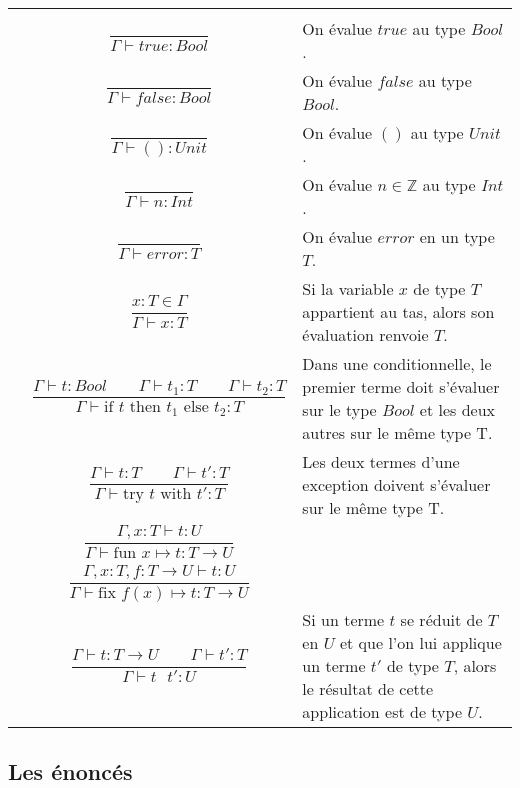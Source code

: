 \documentclass[11pt, a4paper, notitlepage]{article}
\begin{document}
\begin{center}
   \renewcommand{\arraystretch}{2}
   \begin{tabular}{|lcp{}|}
      \hline
      & &\\[-5mm]
      & $\dfrac{}{\Gamma \vdash true : Bool}$ & On évalue $true$ au type $Bool$.\\
      & $\dfrac{}{\Gamma \vdash false : Bool}$ & On évalue $false$ au type $Bool$.\\
      & $\dfrac{}{\Gamma \vdash () : Unit}$ & On évalue $()$ au type $Unit$.\\
      & $\dfrac{}{\Gamma \vdash n : Int}$ & On évalue $n \in \mathbb{Z}$ au type $Int$.\\
      & $\dfrac{}{\Gamma \vdash error : T}$ & On évalue $error$ en un type $T$.\\
      & $\dfrac{x : T \in \Gamma}{\Gamma \vdash x : T}$ & Si la variable $x$ de type $T$ appartient au tas, alors son évaluation renvoie $T$.\\
      & $\dfrac{\Gamma \vdash t : Bool \qquad \Gamma \vdash t_1 : T \qquad \Gamma \vdash t_2 : T}{\Gamma \vdash \text{if } t \text{ then } t_1 \text{ else } t_2 : T}$ & Dans une conditionnelle, le premier terme doit s'évaluer sur le type $Bool$ et les deux autres sur le même type T.\\
      & $\dfrac{\Gamma \vdash t : T \qquad \Gamma \vdash t' : T}{\Gamma \vdash \text{try } t \text{ with } t' : T}$ & Les deux termes d'une exception doivent s'évaluer sur le même type T.\\
      & $\dfrac{\Gamma, x : T \vdash t : U}{\Gamma \vdash \text{fun } x \mapsto t : T \to U}$ &\\
      & $\dfrac{\Gamma, x : T, f : T \to U \vdash t : U}{\Gamma \vdash \text{fix } f(x) \mapsto t : T \to U}$ &\\
      & $\dfrac{\Gamma \vdash t : T \to U \qquad \Gamma \vdash t' : T}{\Gamma \vdash t \text{ } t' : U}$ & Si un terme $t$ se réduit de $T$ en $U$ et que l'on lui applique un terme $t'$ de type $T$, alors le résultat de cette application est de type $U$.\\[5mm]
      \hline
   \end{tabular}
   \renewcommand{\arraystretch}{1}
\end{center}

\subsection{Les énoncés}
\end{document}
